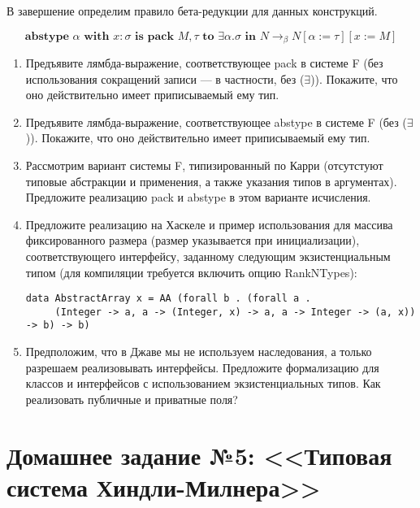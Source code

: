 \documentclass[10pt,a4paper,oneside]{article}
\begin{document}
\begin{enumerate}
В завершение определим правило бета-редукции для данных конструкций.

$$\textbf{abstype }\alpha\textbf{ with }x:\sigma\textbf{ is pack }M,\tau\textbf{ to }\exists\alpha.\sigma\textbf{ in }N
   \rightarrow_\beta N[\alpha:=\tau][x := M]$$

\begin{enumerate}
\item Предъявите лямбда-выражение, соответствующее pack в системе F (без использования сокращений записи ---
в частности, без ($\exists$)). Покажите, что оно действительно имеет приписываемый ему тип.
\item Предъявите лямбда-выражение, соответствующее abstype в системе F (без ($\exists$)). Покажите, что оно действительно имеет приписываемый ему тип.
\item Рассмотрим вариант системы F, типизированный по Карри (отсутстуют типовые абстракции и применения, а также указания
типов в аргументах). Предложите реализацию pack и abstype в этом варианте исчисления.
\item Предложите реализацию на Хаскеле и пример использования для массива фиксированного размера (размер указывается при инициализации), 
соответствующего интерфейсу, заданному следующим экзистенциальным типом (для компиляции требуется включить опцию RankNTypes):

\begin{verbatim}
data AbstractArray x = AA (forall b . (forall a . 
     (Integer -> a, a -> (Integer, x) -> a, a -> Integer -> (a, x)) -> b) -> b)
\end{verbatim}

\item Предположим, что в Джаве мы не используем наследования, а только разрешаем реализовывать интерфейсы. 
Предложите формализацию для классов и интерфейсов с использованием экзистенциальных типов.
Как реализовать публичные и приватные поля?
\end{enumerate}
\end{enumerate}

\section*{Домашнее задание №5: <<Типовая система Хиндли-Милнера>>}
\end{document}

